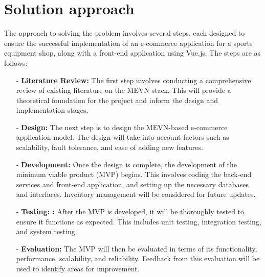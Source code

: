 \section{Solution approach}
The approach to solving the problem involves several steps, each designed to ensure the successful implementation of an e-commerce application for a sports equipment shop, along with a front-end application using Vue.js. The steps are as follows:
\begin{enumerate}
    \item[-] \textbf{Literature Review:} The first step involves conducting a comprehensive review of existing literature on the MEVN stack. This will provide a theoretical foundation for the project and inform the design and implementation stages.
    \item[-] \textbf{Design:} The next step is to design the MEVN-based e-commerce application model. The design will take into account factors such as scalability, fault tolerance, and ease of adding new features.
    \item[-] \textbf{Development:} Once the design is complete, the development of the minimum viable product (MVP) begins. This involves coding the back-end services and front-end application, and setting up the necessary databases and interfaces. Inventory management will be considered for future updates.
    \item[-] \textbf{Testing: :} After the MVP is developed, it will be thoroughly tested to ensure it functions as expected. This includes unit testing, integration testing, and system testing.
    \item[-] \textbf{Evaluation:} The MVP will then be evaluated in terms of its functionality, performance, scalability, and reliability. Feedback from this evaluation will be used to identify areas for improvement.
\end{enumerate}

